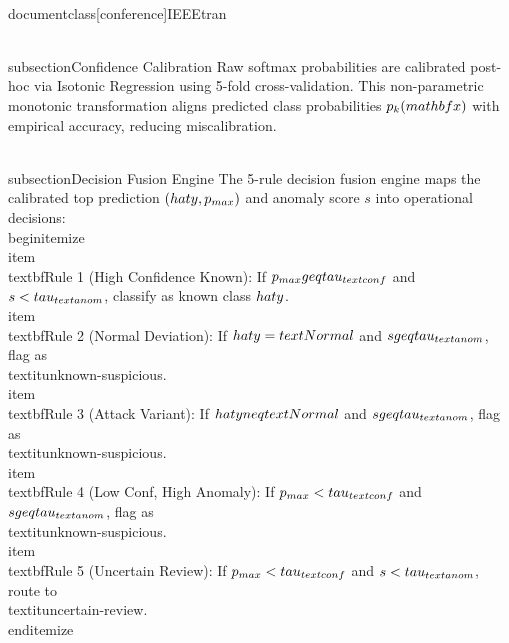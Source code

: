 \\documentclass[conference]{IEEEtran}
\begin{document}
\\subsection{Confidence Calibration}
Raw softmax probabilities are calibrated post-hoc via Isotonic Regression using 5-fold cross-validation. This non-parametric monotonic transformation aligns predicted class probabilities $p_k(\\mathbf{x})$ with empirical accuracy, reducing miscalibration.

\\subsection{Decision Fusion Engine}
The 5-rule decision fusion engine maps the calibrated top prediction $(\\hat{y}, p_{\\max})$ and anomaly score $s$ into operational decisions:
\\begin{itemize}
    \\item \\textbf{Rule 1 (High Confidence Known):} If $p_{\\max} \\geq \\tau_{\\text{conf}}$ and $s < \\tau_{\\text{anom}}$, classify as known class $\\hat{y}$.
    \\item \\textbf{Rule 2 (Normal Deviation):} If $\\hat{y} = \\text{Normal}$ and $s \\geq \\tau_{\\text{anom}}$, flag as \\textit{unknown-suspicious}.
    \\item \\textbf{Rule 3 (Attack Variant):} If $\\hat{y} \\neq \\text{Normal}$ and $s \\geq \\tau_{\\text{anom}}$, flag as \\textit{unknown-suspicious}.
    \\item \\textbf{Rule 4 (Low Conf, High Anomaly):} If $p_{\\max} < \\tau_{\\text{conf}}$ and $s \\geq \\tau_{\\text{anom}}$, flag as \\textit{unknown-suspicious}.
    \\item \\textbf{Rule 5 (Uncertain Review):} If $p_{\\max} < \\tau_{\\text{conf}}$ and $s < \\tau_{\\text{anom}}$, route to \\textit{uncertain-review}.
\\end{itemize}
\end{document}
